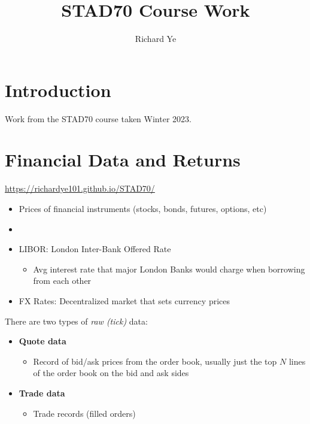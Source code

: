 \documentclass[
  oneside]{book}
\title{STAD70 Course Work}
\author{Richard Ye}
\date{}
\providecommand{\tightlist}{%
  \setlength{\itemsep}{0pt}\setlength{\parskip}{0pt}}
\begin{document}
\maketitle

{
\setcounter{tocdepth}{1}
\tableofcontents
}
\hypertarget{introduction}{%
\chapter{Introduction}\label{introduction}}

Work from the STAD70 course taken Winter 2023.

\hypertarget{financial-data-and-returns}{%
\chapter{Financial Data and Returns}\label{financial-data-and-returns}}

\url{https://richardye101.github.io/STAD70/}

\begin{itemize}
\tightlist
\item
  Prices of financial instruments (stocks, bonds, futures, options, etc)
\item
\item
  LIBOR: London Inter-Bank Offered Rate

  \begin{itemize}
  \tightlist
  \item
    Avg interest rate that major London Banks would charge when borrowing from each other
  \end{itemize}
\item
  FX Rates: Decentralized market that sets currency prices
\end{itemize}

There are two types of \emph{raw (tick)} data:

\begin{itemize}
\tightlist
\item
  \textbf{Quote data}

  \begin{itemize}
  \tightlist
  \item
    Record of bid/ask prices from the order book, usually just the top \(N\) lines of the order book on the bid and ask sides
  \end{itemize}
\item
  \textbf{Trade data}

  \begin{itemize}
  \tightlist
  \item
    Trade records (filled orders)
  \end{itemize}
\end{itemize}
\end{document}
